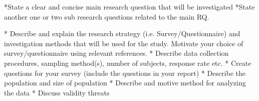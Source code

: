 \documentclass[times, 10pt,twocolumn]{IEEEtran}
\begin{document}
*State a clear and concise main  research  question  that  will  be  investigated
*State another one or  two sub research  questions related to  the main  RQ.



* Describe  and explain the research  strategy (i.e.  Survey/Questionnaire)
and investigation methods that  will  be  used  for the study.  Motivate  your  
choice  of  survey/questionnaire  using relevant  references.
* Describe  data  collection  procedures, sampling  method(s),  number  of  
subjects, response  rate  etc.
* Create  questions for your  survey  (include  the questions in  your  report)
* Describe  the population  and size  of  population
* Describe  and motive  method  for analyzing the data
* Discuss validity  threats


\nocite{ex1,ex2}


\end{document}
